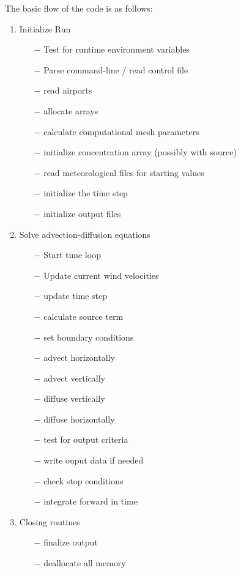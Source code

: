 The basic flow of the code is as follows:
\begin{enumerate}
 \item Initialize Run
 \begin{itemize}
  \item[$-$] Test for runtime environment variables
  \item[$-$] Parse command-line / read control file
  \item[$-$] read airports
  \item[$-$] allocate arrays
  \item[$-$] calculate computational mesh parameters
  \item[$-$] initialize concentration array (possibly with source)
  \item[$-$] read meteorological files for starting values
  \item[$-$] initialize the time step
  \item[$-$] initialize output files
 \end{itemize}
 \item Solve advection-diffusion equations
 \begin{itemize}
  \item[$-$] Start time loop
  \item[$-$] Update current wind velocities
  \item[$-$] update time step
  \item[$-$] calculate source term
  \item[$-$] set boundary conditions
  \item[$-$] advect horizontally
  \item[$-$] advect vertically
  \item[$-$] diffuse vertically
  \item[$-$] diffuse horizontally
  \item[$-$] test for output criteria
  \item[$-$] write ouput data if needed
  \item[$-$] check stop conditions
  \item[$-$] integrate forward in time
 \end{itemize}
 \item Closing routines
 \begin{itemize}
  \item[$-$] finalize output
  \item[$-$] deallocate all memory
 \end{itemize}
\end{enumerate}


